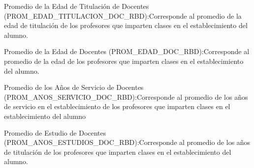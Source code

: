 \begin{longdescription}
\begin{longdescription}
                \item[Promedio de la Edad de Titulación de Docentes]
                (PROM\_EDAD\_TITULACION\_DOC\_RBD):Corresponde al promedio de la edad de titulación de los profesores que imparten clases en el establecimiento del alumno.
                
                \item[Promedio de la Edad de Docentes]
                (PROM\_EDAD\_DOC\_RBD):Corresponde al promedio de la edad de los profesores que imparten clases en el establecimiento del alumno.
                
                \item[Promedio de los Años de Servicio de Docentes]
                (PROM\_ANOS\_SERVICIO\_DOC\_RBD):Corresponde al promedio de los años de servicio en el establecimiento de los profesores que imparten clases en el establecimiento del alumno
                
                \item[Promedio de Estudio de Docentes]
                (PROM\_ANOS\_ESTUDIOS\_DOC\_RBD):Corresponde al promedio de los años de titulación de los profesores que imparten clases en el establecimiento del alumno.
                

\end{longdescription}
\end{longdescription}
